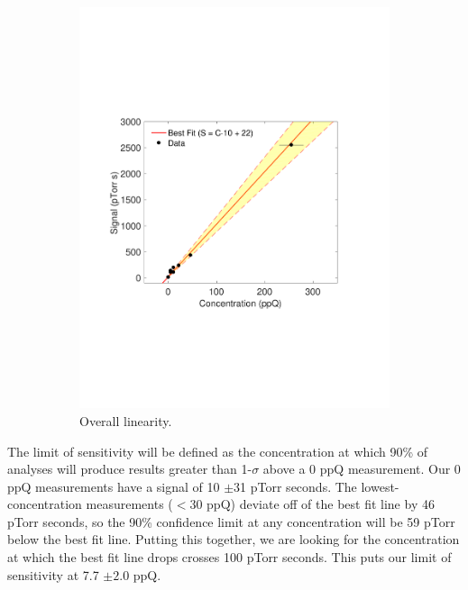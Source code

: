 \documentclass[12pt]{article}
\begin{document}
\begin{figure}[h!]
\begin{subfigure}{0.5\textwidth}
  \centering
  \includegraphics[width=\textwidth]{Figures/LinPlot0217.pdf}
  \caption{Overall linearity.}
\end{subfigure}
\caption{}
\label{fig:linplot2017}
\end{figure}

The limit of sensitivity will be defined as the concentration at which 90\% of analyses will produce results greater than 1-$\sigma$ above a 0 ppQ measurement. Our 0 ppQ measurements have a signal of 10 $\pm$31 pTorr seconds. The lowest-concentration measurements ($<30$ ppQ) deviate off of the best fit line by 46 pTorr seconds, so the 90\% confidence limit at any concentration will be 59 pTorr below the best fit line. Putting this together, we are looking for the concentration at which the best fit line drops crosses 100 pTorr seconds. This puts our limit of sensitivity at 7.7 $\pm 2.0$ ppQ.
\end{document}
